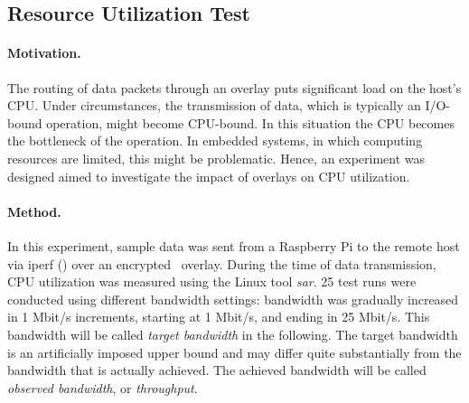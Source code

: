 \subsection{Resource Utilization Test} \label{sec:utilization}
\paragraph{Motivation.} The routing of data packets through an overlay puts significant load on the host's CPU. Under circumstances, the transmission of data, which is typically an I/O-bound operation, might become CPU-bound. In this situation the CPU becomes the bottleneck of the operation. In embedded systems, in which computing resources are limited, this might be problematic. Hence, an experiment was designed aimed to investigate the impact of overlays on CPU utilization.

\paragraph{Method.} In this experiment, sample data was sent from a Raspberry Pi to the remote host via iperf (\cf {}) over an encrypted \wnet\ overlay. During the time of data transmission, CPU utilization was measured using the Linux tool \emph{sar}. 25 test runs were conducted using different bandwidth settings: bandwidth was gradually increased in 1 Mbit/s increments, starting at 1 Mbit/s, and ending in 25 Mbit/s. This bandwidth will be called \emph{target bandwidth} in the following. The target bandwidth is an artificially imposed upper bound and may differ quite substantially from the bandwidth that is actually achieved. The achieved bandwidth will be called \emph{observed bandwidth}, or \emph{throughput}.

